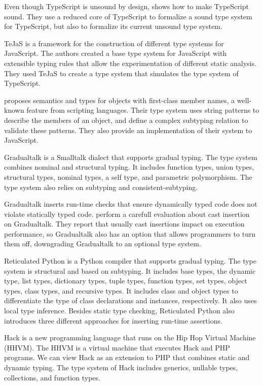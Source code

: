 Even though TypeScript is unsound by design,
\citet{bierman2014typescript} shows how to make TypeScript sound.
They use a reduced core of TypeScript to formalize a
sound type system for TypeScript, but also to formalize
its current unsound type system.

TeJaS \citep{lerner2013tejas} is a framework for the construction of
different type systems for JavaScript.
The authors created a base type system for JavaScript with
extensible typing rules that allow the experimentation of
different static analysis.
They used TeJaS to create a type system that simulates the
type system of TypeScript.

\citet{politz2012semantics} proposes semantics and types for objects
with first-class member names, a well-known feature from scripting languages.
Their type system uses string patterns to describe the members of
an object, and define a complex subtyping relation to validate
these patterns.
They also provide an implementation of their system to JavaScript.

Gradualtalk \citep{allende2013gts} is a Smalltalk dialect that
supports gradual typing.
The type system combines nominal and structural typing.
It includes function types, union types, structural types,
nominal types, a self type, and parametric polymorphism.
The type system also relies on subtyping and consistent-subtyping.

Gradualtalk inserts run-time checks that ensure dynamically
typed code does not violate statically typed code.
\citet{allende2013cis} perform a carefull evaluation about
cast insertion on Gradualtalk.
They report that usually cast insertions impact on execution
performance, so Gradualtalk also has an option that allows
programmers to turn them off, downgrading Gradualtalk
to an optional type system.

Reticulated Python \citep{vitousek2014deg} is a Python compiler
that supports gradual typing.
The type system is structural and based on subtyping.
It includes base types, the dynamic type, list types,
dictionary types, tuple types, function types, set types,
object types, class types, and recursive types.
It includes class and object types to differentiate the
type of class declarations and instances, respectively.
It also uses local type inference.
Besides static type checking, Reticulated Python also introduces
three different approaches for inserting run-time assertions.

Hack \citep{hack} is a new programming language that runs on the
Hip Hop Virtual Machine (HHVM).
The HHVM is a virtual machine that executes Hack and PHP programs.
We can view Hack as an extension to PHP that combines static and
dynamic typing.
The type system of Hack includes generics, nullable types, collections,
and function types.

